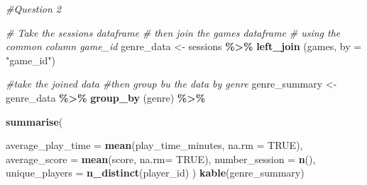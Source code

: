 \documentclass[
]{article}
\newenvironment{Shaded}{\begin{snugshade}}{\end{snugshade}}
\newcommand{\AttributeTok}[1]{\textcolor[rgb]{0.13,0.29,0.53}{#1}}
\newcommand{\CommentTok}[1]{\textcolor[rgb]{0.56,0.35,0.01}{\textit{#1}}}
\newcommand{\ConstantTok}[1]{\textcolor[rgb]{0.56,0.35,0.01}{#1}}
\newcommand{\FunctionTok}[1]{\textcolor[rgb]{0.13,0.29,0.53}{\textbf{#1}}}
\newcommand{\NormalTok}[1]{#1}
\newcommand{\OtherTok}[1]{\textcolor[rgb]{0.56,0.35,0.01}{#1}}
\newcommand{\SpecialCharTok}[1]{\textcolor[rgb]{0.81,0.36,0.00}{\textbf{#1}}}
\newcommand{\StringTok}[1]{\textcolor[rgb]{0.31,0.60,0.02}{#1}}
\begin{document}
\begin{Shaded}
\begin{Highlighting}[]
\CommentTok{\#Question 2}

\CommentTok{\# Take the sessions dataframe }
\CommentTok{\# then join the games dataframe }
\CommentTok{\# using the common column game\_id }
\NormalTok{  genre\_data }\OtherTok{\textless{}{-}}\NormalTok{ sessions }\SpecialCharTok{\%\textgreater{}\%}
    \FunctionTok{left\_join}\NormalTok{ (games, }\AttributeTok{by =} \StringTok{"game\_id"}\NormalTok{)}
  
\CommentTok{\#take the joined data}
\CommentTok{\#then group bu the data by genre }
\NormalTok{  genre\_summary }\OtherTok{\textless{}{-}}\NormalTok{ genre\_data }\SpecialCharTok{\%\textgreater{}\%}
  \FunctionTok{group\_by}\NormalTok{ (genre) }\SpecialCharTok{\%\textgreater{}\%}
    
 \FunctionTok{summarise}\NormalTok{(}
      
      \AttributeTok{average\_play\_time =} \FunctionTok{mean}\NormalTok{(play\_time\_minutes, }\AttributeTok{na.rm =} \ConstantTok{TRUE}\NormalTok{),}
      \AttributeTok{average\_score =} \FunctionTok{mean}\NormalTok{(score, }\AttributeTok{na.rm=} \ConstantTok{TRUE}\NormalTok{),}
      \AttributeTok{number\_session =} \FunctionTok{n}\NormalTok{(), }
      \AttributeTok{unique\_players =} \FunctionTok{n\_distinct}\NormalTok{(player\_id)}
\NormalTok{    )}
   \FunctionTok{kable}\NormalTok{(genre\_summary)}
\end{Highlighting}
\end{Shaded}
\end{document}
